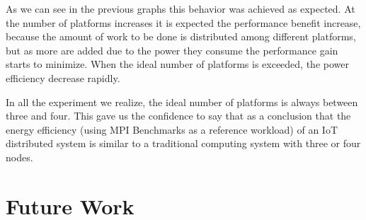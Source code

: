 As we can see in the previous graphs this behavior was achieved as expected. At
the number of platforms increases it is expected the performance benefit
increase, because the amount of work to be done is distributed among different
platforms, but as more are added due to the power they consume the performance
gain starts to minimize. When the ideal number of platforms is exceeded, the
power efficiency decrease rapidly.

In all the experiment we realize, the ideal number of platforms is always
between three and four. This gave us the confidence to say that as a conclusion
that the energy efficiency (using MPI Benchmarks as a reference workload) of an
IoT distributed system is similar to a traditional computing system \cite{NUC}
with three or four nodes.

\section{Future Work}
\noindent

\clearpage
